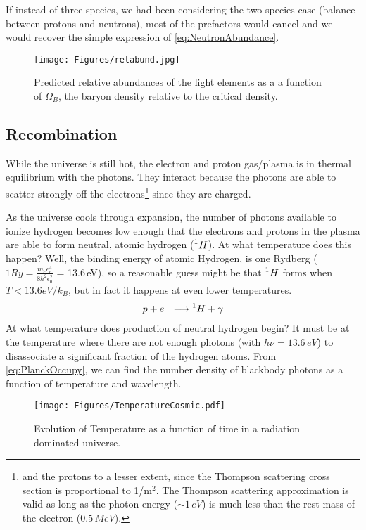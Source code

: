 If instead of three species, we had been considering the two species case (balance between protons and neutrons), most of the prefactors would cancel and we would recover the simple expression of \cref{eq:NeutronAbundance}.


\begin{figure}[h]
\centering
\texttt{[image: Figures/relabund.jpg]}
\caption{Predicted relative abundances of the light elements as a
a function of $\Omega_B$, the baryon density relative to the 
critical density.}
\label{fig:Neutrons}
\end{figure}


\subsection{Recombination}
While the universe is still hot, the electron and proton gas/plasma is in thermal equilibrium with the photons. They interact because the photons are able to scatter strongly off the electrons\footnote{and the protons to a lesser extent, since the Thompson scattering cross section is proportional to 1/m$^2$. The Thompson scattering approximation is valid as long as the photon 
energy ($\sim 1\,eV$) is much less than the rest mass of the 
electron ($0.5\,MeV$).} since they are charged.

As the universe cools through expansion, the number of photons available to ionize 
hydrogen becomes low enough that the electrons and protons in the plasma are able to 
form neutral, atomic hydrogen ($\prescript{1}{}H$). At what temperature does this happen? Well, the
binding energy of atomic Hydrogen, is one Rydberg 
($1 Ry = \frac{m_e e_c^4}{8 h^2 \epsilon_0^2}$ = 13.6\,eV), so a reasonable guess might be that
$\prescript{1}{}H$ forms when $T < 13.6 eV / k_B$, but in fact it happens at even lower temperatures. 
\begin{align}
p + e^- \longrightarrow \prescript{1}{}H + \gamma
\end{align}
At what temperature does production of neutral hydrogen begin? It must be at the temperature where there are not enough photons (with $h \nu = 13.6\,eV$) to disassociate a significant fraction of the hydrogen atoms. 
From \cref{eq:PlanckOccupy}, we can find the number density of 
blackbody photons as a function of temperature and wavelength.


\begin{figure}[h]
\centering
\texttt{[image: Figures/TemperatureCosmic.pdf]}
\caption{Evolution of Temperature as a function of time in a radiation dominated universe.}
\label{fig:TempVsTime}
\end{figure}



